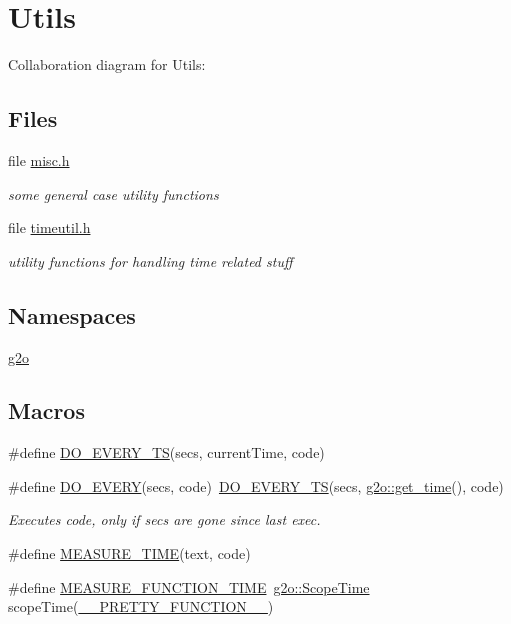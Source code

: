 \hypertarget{group__utils}{}\section{Utils}
\label{group__utils}
Collaboration diagram for Utils\+:
\subsection*{Files}
\begin{DoxyCompactItemize}
\item 
file \hyperlink{misc_8h}{misc.\+h}
\begin{DoxyCompactList}\small\item\em some general case utility functions \end{DoxyCompactList}\item 
file \hyperlink{timeutil_8h}{timeutil.\+h}
\begin{DoxyCompactList}\small\item\em utility functions for handling time related stuff \end{DoxyCompactList}\end{DoxyCompactItemize}
\subsection*{Namespaces}
\begin{DoxyCompactItemize}
\item 
 \hyperlink{namespaceg2o}{g2o}
\end{DoxyCompactItemize}
\subsection*{Macros}
\begin{DoxyCompactItemize}
\item 
\#define \hyperlink{group__utils_ga9b9f34c01b03b47644c2762bf256be32}{D\+O\+\_\+\+E\+V\+E\+R\+Y\+\_\+\+TS}(secs,  current\+Time,  code)
\item 
\#define \hyperlink{group__utils_gabfe958da8833edbe74250507adc61635}{D\+O\+\_\+\+E\+V\+E\+RY}(secs,  code)~\hyperlink{group__utils_ga9b9f34c01b03b47644c2762bf256be32}{D\+O\+\_\+\+E\+V\+E\+R\+Y\+\_\+\+TS}(secs, \hyperlink{namespaceg2o_a6baa8fdfd973b5b970df14f14fd5d844}{g2o\+::get\+\_\+time}(), code)
\begin{DoxyCompactList}\small\item\em Executes code, only if secs are gone since last exec. \end{DoxyCompactList}\item 
\#define \hyperlink{group__utils_gaafc27d8d00ac925dce6e52a013cc2b32}{M\+E\+A\+S\+U\+R\+E\+\_\+\+T\+I\+ME}(text,  code)
\item 
\#define \hyperlink{group__utils_gae79acf8eb730f80c029d60e19332b4b9}{M\+E\+A\+S\+U\+R\+E\+\_\+\+F\+U\+N\+C\+T\+I\+O\+N\+\_\+\+T\+I\+ME}~\hyperlink{classg2o_1_1ScopeTime}{g2o\+::\+Scope\+Time} scope\+Time(\hyperlink{macros_8h_a9c15fe1e91b07ea3280f5239f9841b67}{\+\_\+\+\_\+\+P\+R\+E\+T\+T\+Y\+\_\+\+F\+U\+N\+C\+T\+I\+O\+N\+\_\+\+\_\+})
\end{DoxyCompactItemize}
